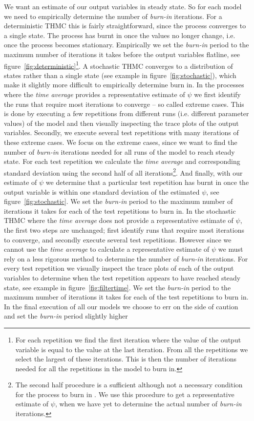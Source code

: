 \documentclass[preprint, 12pt]{elsarticle}
\begin{document}
We want an estimate of our output variables in steady state. So for each model we need to empirically determine the number of \emph{burn-in} iterations. For a deterministic THMC this is fairly straightforward, since the process converges to a single state. The process has burnt in once the values no longer change, i.e. once the process becomes stationary. Empirically we set the \emph{burn-in} period to the maximum number of iterations it takes before the output variables flatline, see figure~\ref{fig:deterministic}\footnote{For each repetition we find the first iteration where the value of the output variable is equal to the value at the last iteration. From all the repetitions we select the largest of these iterations. This is then the number of iterations needed for all the repetitions in the model to burn in.}. A stochastic THMC converges to a distribution of states rather than a single state (see example in figure~\ref{fig:stochastic}), which make it slightly more difficult to empirically determine burn in. In the processes where the \emph{time average} provides a representative estimate of $\psi$ we first identify the runs that require most iterations to converge -- so called extreme cases. This is done by executing a few repetitions from different runs (i.e. different parameter values) of the model and then visually inspecting the trace plots of the output variables. Secondly, we execute several test repetitions with many iterations of these extreme cases. We focus on the extreme cases, since we want to find the number of \emph{burn-in} iterations needed for all runs of the model to reach steady state. For each test repetition we calculate the \emph{time average} and corresponding standard deviation using the second half of all iterations\footnote{The second half procedure is a sufficient although not a necessary condition for the process to burn in \citep[chapter~4, p.~73]{Laver_Sergenti_2011}. We use this procedure to get a representative estimate of $\psi$, when we have yet to determine the actual number of \emph{burn-in} iterations.}. And finally, with our estimate of $\psi$ we determine that a particular test repetition has burnt in once the output variable is within one standard deviation of the estimated $\psi$, see figure~\ref{fig:stochastic}. We set the \emph{burn-in} period to the maximum number of iterations it takes for each of the test repetitions to burn in. In the stochastic THMC where the \emph{time average} does not provide a representative estimate of $\psi$, the first two steps are unchanged; first identify runs that require most iterations to converge, and secondly execute several test repetitions. However since we cannot use the \emph{time average} to calculate a representative estimate of $\psi$ we must rely on a less rigorous method to determine the number of \emph{burn-in} iterations. For every test repetition we visually inspect the trace plots of each of the output variables to determine when the test repetition appears to have reached steady state, see example in figure~\ref{fig:filtertime}. We set the \emph{burn-in} period to the maximum number of iterations it takes for each of the test repetitions to burn in. In the final execution of all our models we choose to err on the side of caution and set the \emph{burn-in} period slightly higher 
\end{document}

